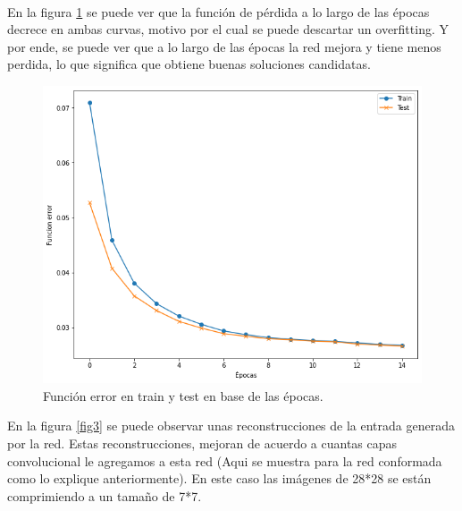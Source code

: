 \documentclass{article}
\begin{document}
\\

En la figura \ref{fig1} se puede ver que la función de pérdida a lo largo de las épocas decrece en ambas curvas, motivo por el cual se puede descartar un overfitting. Y por ende, se puede ver que a lo largo de las épocas la red mejora y tiene menos perdida, lo que significa que obtiene buenas soluciones candidatas.

\begin{figure}[H]
\centering
\includegraphics[width=\textwidth]{Train-vs-test.png}
\caption{Función error en train y test en base de las épocas.}
\label{fig1}
\end{figure}

En la figura \ref{fig3} se puede observar unas reconstrucciones de la entrada generada por la red.
Estas reconstrucciones, mejoran de acuerdo a cuantas capas convolucional le agregamos a esta red (Aqui se muestra para la red conformada como lo explique anteriormente). En este caso las imágenes de 28*28 se están comprimiendo a un tamaño de 7*7.
\end{document}
